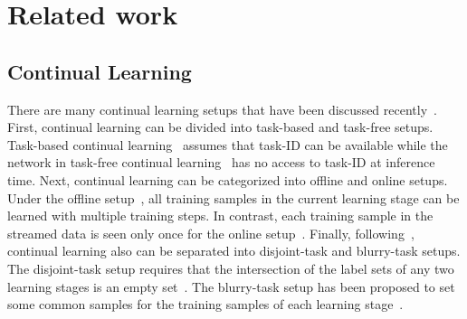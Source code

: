 \section{Related work}
\label{sec:relatedwork}
\subsection{Continual Learning}

There are many continual learning setups that have been discussed recently~\cite{prabhu2020gdumb}. First, continual learning can be divided into task-based and task-free setups. Task-based continual learning~\cite{delange2021continual,zhao2023adaptcl} assumes that task-ID can be available while the network in task-free continual learning~\cite{zhou2021learning} has no access to task-ID at inference time. Next, continual learning can be categorized into offline and online setups. Under the offline setup~\cite{sun2020continual}, all training samples in the current learning stage can be learned with multiple training steps. In contrast, each training sample in the streamed data is seen only once for the online setup~\cite{mai2022online}. Finally, following~\cite{koh2021online}, continual learning also can be separated into disjoint-task and blurry-task setups. The disjoint-task setup requires that the intersection of the label sets of any two learning stages is an empty set~\cite{aljundi2019task}. The blurry-task setup has been proposed to set some common samples for the training samples of each learning stage~\cite{bang2021rainbow}. 


